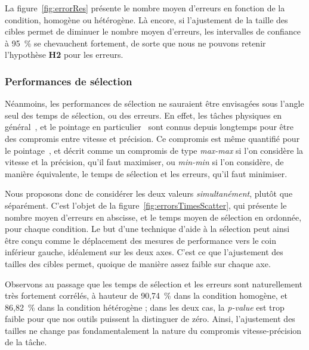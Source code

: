 	La figure~\ref{fig:errorRes} présente le nombre moyen d'erreurs en fonction de la condition, homogène ou hétérogène. Là encore, si l'ajustement de la taille des cibles permet de diminuer le nombre moyen d'erreurs, les intervalles de confiance à 95~\%{} se chevauchent fortement, de sorte que nous ne pouvons retenir l'hypothèse \textbf{H2} pour les erreurs.
	
	\subsubsection{Performances de sélection}
	\label{sub:product}
	Néanmoins, les performances de sélection ne sauraient être envisagées sous l'angle seul des temps de sélection, ou des erreurs. En effet, les tâches physiques en général~\cite{woodworth1899accuracy}, et le pointage en particulier~\cite{fitts1966cognitive} sont connus depuis longtemps pour être des compromis entre vitesse et précision. Ce compromis est même quantifié pour le pointage~\cite{mackenzie2008fitts, guiard2011fitt, guiard2015mathematical}, et décrit comme un compromis de type \emph{max-max} si l'on considère la vitesse et la précision, qu'il faut maximiser, ou \emph{min-min} si l'on considère, de manière équivalente, le temps de sélection et les erreurs, qu'il faut minimiser.
	
	Nous proposons donc de considérer les deux valeurs \emph{simultanément}, plutôt que séparément. C'est l'objet de la figure~\ref{fig:errorsTimesScatter}, qui présente le nombre moyen d'erreurs en abscisse, et le temps moyen de sélection en ordonnée, pour chaque condition. Le but d'une technique d'aide à la sélection peut ainsi être conçu comme le déplacement des mesures de performance vers le coin inférieur gauche, idéalement sur les deux axes. C'est ce que l'ajustement des tailles des cibles permet, quoique de manière assez faible sur chaque axe.
	
	Observons au passage que les temps de sélection et les erreurs sont naturellement très fortement corrélés, à hauteur de 90,74~\%{} dans la condition homogène, et 86,82~\%{} dans la condition hétérogène ; dans les deux cas, la \emph{p-value} est trop faible pour que nos outils puissent la distinguer de zéro. Ainsi, l'ajustement des tailles ne change pas fondamentalement la nature du compromis vitesse-précision de la tâche.
	
